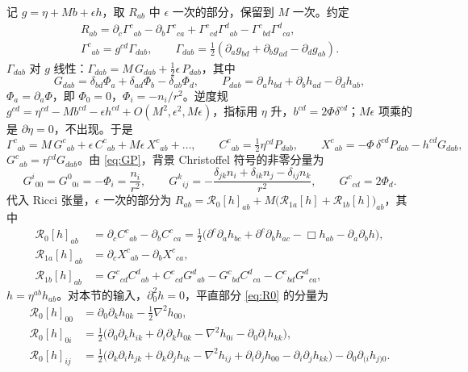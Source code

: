 \documentclass[11pt,a4paper]{ctexart}
\numberwithin{equation}{section}
\begin{document}
记 $g=\eta+Mb+\epsilon h$，取 $R_{ab}$ 中 $\epsilon$ 一次的部分，保留到 $M$ 一次。约定
\begin{gather}
R_{ab}=\partial_c\Gamma^c{}_{ab}-\partial_b\Gamma^c{}_{ca}+\Gamma^c{}_{cd}\Gamma^d{}_{ab}-\Gamma^c{}_{bd}\Gamma^d{}_{ca},\nonumber\\
\Gamma^c{}_{ab}=g^{cd}\Gamma_{dab},\qquad \Gamma_{dab}=\tfrac12(\partial_ag_{bd}+\partial_bg_{ad}-\partial_dg_{ab}).
\end{gather}
$\Gamma_{dab}$ 对 $g$ 线性：$\Gamma_{dab}=M\,G_{dab}+\tfrac12\epsilon\,P_{dab}$，其中
\begin{equation}
G_{dab}=\delta_{bd}\Phi_a+\delta_{ad}\Phi_b-\delta_{ab}\Phi_d,\qquad
P_{dab}=\partial_ah_{bd}+\partial_bh_{ad}-\partial_dh_{ab},
\label{eq:GP}
\end{equation}
$\Phi_a=\partial_a\Phi$，即 $\Phi_0=0$，$\Phi_i=-n_i/r^2$。逆度规 $g^{cd}=\eta^{cd}-Mb^{cd}-\epsilon h^{cd}+O(M^2,\epsilon^2,M\epsilon)$，指标用 $\eta$ 升，$b^{cd}=2\Phi\delta^{cd}$；$M\epsilon$ 项乘的是 $\partial\eta=0$，不出现。于是
\begin{equation}
\Gamma^c{}_{ab}=M\,G^c{}_{ab}+\epsilon\,C^c{}_{ab}+M\epsilon\,X^c{}_{ab}+\dots,\qquad
C^c{}_{ab}=\tfrac12\eta^{cd}P_{dab},\qquad
X^c{}_{ab}=-\Phi\,\delta^{cd}P_{dab}-h^{cd}G_{dab},
\label{eq:Xdef}
\end{equation}
$G^c{}_{ab}=\eta^{cd}G_{dab}$。由 \eqref{eq:GP}，背景 Christoffel 符号的非零分量为
\begin{equation}
G^i{}_{00}=G^0{}_{0i}=-\Phi_i=\frac{n_i}{r^2},\qquad
G^k{}_{ij}=-\frac{\delta_{jk}n_i+\delta_{ik}n_j-\delta_{ij}n_k}{r^2},\qquad
G^c{}_{cd}=2\Phi_d .
\label{eq:Gcomp}
\end{equation}
代入 Ricci 张量，$\epsilon$ 一次的部分为 $R_{ab}=\mathcal R_0[h]_{ab}+M\big(\mathcal R_{1a}[h]+\mathcal R_{1b}[h]\big)_{ab}$，其中
\begin{align}
\mathcal R_0[h]_{ab}&=\partial_cC^c{}_{ab}-\partial_bC^c{}_{ca}
=\tfrac12\big(\partial^c\partial_ah_{bc}+\partial^c\partial_bh_{ac}-\Box h_{ab}-\partial_a\partial_bh\big),
\label{eq:R0}\\
\mathcal R_{1a}[h]_{ab}&=\partial_cX^c{}_{ab}-\partial_bX^c{}_{ca},
\label{eq:R1a}\\
\mathcal R_{1b}[h]_{ab}&=G^c{}_{cd}C^d{}_{ab}+C^c{}_{cd}G^d{}_{ab}-G^c{}_{bd}C^d{}_{ca}-C^c{}_{bd}G^d{}_{ca},
\label{eq:R1b}
\end{align}
$h=\eta^{ab}h_{ab}$。对本节的输入，$\partial_0^2h=0$，平直部分 \eqref{eq:R0} 的分量为
\begin{align}
\mathcal R_0[h]_{00}&=\partial_0\partial_kh_{0k}-\tfrac12\nabla^2h_{00},\nonumber\\
\mathcal R_0[h]_{0i}&=\tfrac12\big(\partial_0\partial_kh_{ik}+\partial_i\partial_kh_{0k}-\nabla^2h_{0i}-\partial_0\partial_ih_{kk}\big),\label{eq:R0comp}\\
\mathcal R_0[h]_{ij}&=\tfrac12\big(\partial_k\partial_ih_{jk}+\partial_k\partial_jh_{ik}-\nabla^2h_{ij}+\partial_i\partial_jh_{00}-\partial_i\partial_jh_{kk}\big)-\partial_0\partial_{(i}h_{j)0}.\nonumber
\end{align}
\end{document}
